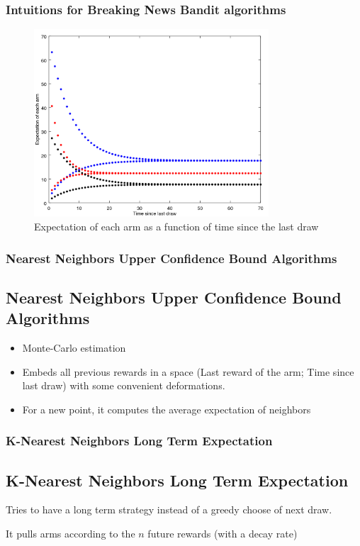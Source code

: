 \documentclass[french]{beamer}
\begin{document}
\begin{frame}
	\frametitle{Intuitions for Breaking News Bandit algorithms}
	\begin{figure}[h]
		\begin{center}
			\includegraphics[width=0.78\textwidth]{expectations.png}
		\end{center}
		\caption{Expectation of each arm as a function of time since the last draw}
	\end{figure}
	
\end{frame}

\begin{frame}
	\frametitle{Nearest Neighbors Upper Confidence Bound Algorithms}
	
	\subsection{Nearest Neighbors Upper Confidence Bound Algorithms}
	
	\begin{itemize}
		\item Monte-Carlo estimation
		\item Embeds all previous rewards in a space (Last reward of the arm; Time since last draw) with some convenient deformations.
		\item For a new point, it computes the average expectation of neighbors
	\end{itemize}
	
\end{frame}

\begin{frame}
	\frametitle{K-Nearest Neighbors Long Term Expectation}
	
	\subsection{K-Nearest Neighbors Long Term Expectation}
	
	Tries to have a long term strategy instead of a greedy choose of next draw.
	\newline
	
	It pulls arms according to the $n$ future rewards (with a decay rate)
	
\end{frame}
\end{document}
